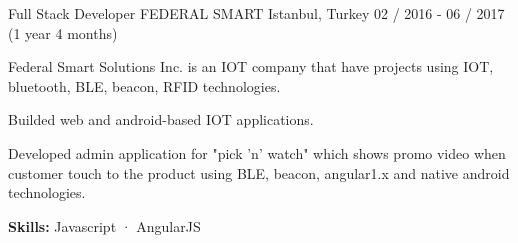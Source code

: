 \begin{cventries}
  \cventry
    {Full Stack Developer} %
    {FEDERAL SMART} %
    {Istanbul, Turkey} %
    {02 / 2016 - 06 / 2017 (1 year 4 months)}
    {
      \begin{cvitems} %
        \item {Federal Smart Solutions Inc. is an IOT company that have projects using IOT, bluetooth, BLE, beacon, RFID technologies.}
        \item {Builded web and android-based IOT applications.}
        \item {Developed admin application for "pick 'n' watch" which shows promo video when customer touch to the product using BLE, beacon, angular1.x and native android technologies.}
        \item {\textbf {\textbf {Skills:}} Javascript · AngularJS}
      \end{cvitems}
    }

\end{cventries}

